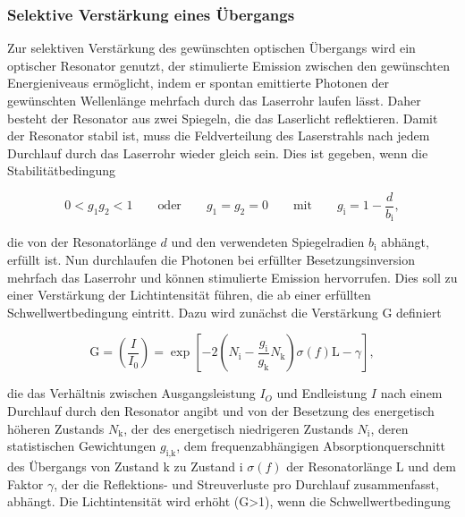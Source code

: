         \subsubsection{Selektive Verstärkung eines Übergangs}
            Zur selektiven Verstärkung des gewünschten optischen Übergangs wird ein optischer Resonator genutzt, der stimulierte Emission zwischen den gewünschten Energieniveaus ermöglicht, indem er spontan
            emittierte Photonen der gewünschten Wellenlänge mehrfach durch das Laserrohr laufen lässt. Daher besteht der Resonator aus zwei Spiegeln, die das Laserlicht reflektieren. Damit der Resonator stabil 
            ist, muss die Feldverteilung des Laserstrahls nach jedem Durchlauf durch das Laserrohr wieder gleich sein. Dies ist gegeben, wenn die Stabilitätbedingung
            
            \begin{equation*}
                0 < g_1g_2 < 1 \qquad \text{oder} \qquad g_1=g_2=0 \qquad \text{mit} \qquad g_{\text{i}} = 1 - \frac{d}{b_{\text{i}}},
                \label{eqn:Stabilitätsbedingung}
            \end{equation*}

            die von der Resonatorlänge $d$ und den verwendeten Spiegelradien $b_{\text{i}}$ abhängt, erfüllt ist. \newline
            Nun durchlaufen die Photonen bei erfüllter Besetzungsinversion mehrfach das Laserrohr und können stimulierte Emission hervorrufen. Dies soll zu einer Verstärkung der Lichtintensität führen, die ab
            einer erfüllten Schwellwertbedingung eintritt. Dazu wird zunächst die Verstärkung G definiert

            \begin{equation}
                \text{G} = \left(\frac{I}{I_0}\right) = \exp \left[-2\left(N_{\text{i}} - \frac{g_{\text{i}}}{g_{\text{k}}}N_{\text{k}}\right)\sigma(f)\text{L} - \gamma\right],
                \label{eqn:Verstärkung}
            \end{equation}

            die das Verhältnis zwischen Ausgangsleistung $I_O$ und Endleistung $I$ nach einem Durchlauf durch den Resonator angibt und von der Besetzung des energetisch höheren Zustands $N_{\text{k}}$, der des 
            energetisch niedrigeren Zustands $N_{\text{i}}$, deren statistischen Gewichtungen $g_{\text{i,k}}$, dem frequenzabhängigen Absorptionquerschnitt des Übergangs von Zustand k zu Zustand i $\sigma (f)$
            der Resonatorlänge L und dem Faktor $\gamma$, der die Reflektions- und Streuverluste pro Durchlauf zusammenfasst, abhängt. Die Lichtintensität wird erhöht (G>1), wenn die Schwellwertbedingung

